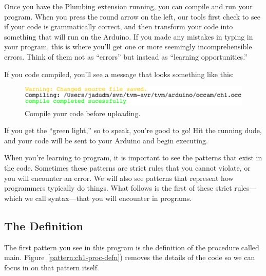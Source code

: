 Once you have the Plumbing extension running, you can compile and run your program. When you press the round arrow on the left, our tools first check to see if your code is grammatically correct, and then transform your code into something that will run on the Arduino. If you made any mistakes in typing in your program, this is where you'll get one or more seemingly incomprehensible errors. Think of them not as ``errors'' but instead as ``learning opportunities.''
         
\newpage
                                
If you code compiled, you'll see a message that looks something like this:

\begin{figure}[ht]
  \begin{center}
    \includegraphics[width=0.8\linewidth]{screenshots/20100108-compile-successful}
    \caption{Compile your code before uploading.}
    \label{screenshot:compile-successful}
  \end{center}
\end{figure}

If you get the ``green light,'' so to speak, you're good to go! Hit the running dude, and your code will be sent to your Arduino and begin executing.

\PATTERNS
When you're learning to program, it is important to see the patterns that exist in the code. Sometimes these patterns are strict rules that you cannot violate, or you will encounter an error. We will also see patterns that represent how programmers typically do things. What follows is the first of these strict rules---which we call {\strong syntax}---that you will encounter in \occam programs. 

\subsection{The \PROCedure Definition}
The first pattern you see in this program is the definition of the procedure called {\code main}. Figure~\vref{pattern:ch1-proc-defn}) removes the details of the code so we can focus in on that pattern itself.

